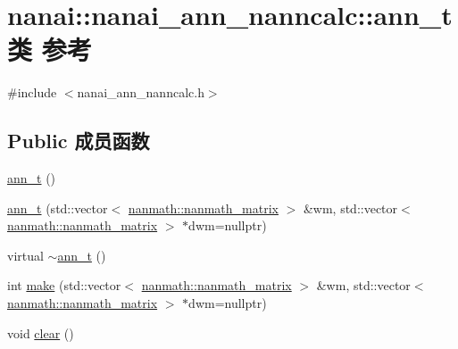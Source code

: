 \hypertarget{classnanai_1_1nanai__ann__nanncalc_1_1ann__t}{}\section{nanai\+:\+:nanai\+\_\+ann\+\_\+nanncalc\+:\+:ann\+\_\+t类 参考}
\label{classnanai_1_1nanai__ann__nanncalc_1_1ann__t}


{\ttfamily \#include $<$nanai\+\_\+ann\+\_\+nanncalc.\+h$>$}

\subsection*{Public 成员函数}
\begin{DoxyCompactItemize}
\item 
\hyperlink{classnanai_1_1nanai__ann__nanncalc_1_1ann__t_ac515917b099f147e2a27554fc21e27be}{ann\+\_\+t} ()
\item 
\hyperlink{classnanai_1_1nanai__ann__nanncalc_1_1ann__t_ae7afd80669ae15785019431171f791c6}{ann\+\_\+t} (std\+::vector$<$ \hyperlink{classnanmath_1_1nanmath__matrix}{nanmath\+::nanmath\+\_\+matrix} $>$ \&wm, std\+::vector$<$ \hyperlink{classnanmath_1_1nanmath__matrix}{nanmath\+::nanmath\+\_\+matrix} $>$ $\ast$dwm=nullptr)
\item 
virtual \hyperlink{classnanai_1_1nanai__ann__nanncalc_1_1ann__t_a73fe38762c283afdb7980b9909124daf}{$\sim$ann\+\_\+t} ()
\item 
int \hyperlink{classnanai_1_1nanai__ann__nanncalc_1_1ann__t_a20e243d38063b430a487f870416457e5}{make} (std\+::vector$<$ \hyperlink{classnanmath_1_1nanmath__matrix}{nanmath\+::nanmath\+\_\+matrix} $>$ \&wm, std\+::vector$<$ \hyperlink{classnanmath_1_1nanmath__matrix}{nanmath\+::nanmath\+\_\+matrix} $>$ $\ast$dwm=nullptr)
\item 
void \hyperlink{classnanai_1_1nanai__ann__nanncalc_1_1ann__t_acbeda89aa6636ea5e0e7d2ee711baaba}{clear} ()
\end{DoxyCompactItemize}
